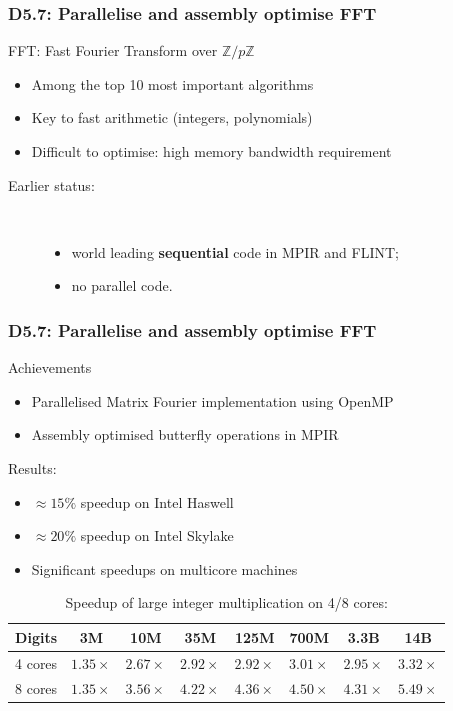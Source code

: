 \documentclass{beamer}
\begin{document}
\begin{frame}
  \frametitle{D5.7: Parallelise and assembly optimise FFT}

  \begin{block}    {FFT: Fast Fourier Transform over $\mathbb{Z}/p\mathbb{Z}$}
    \begin{itemize}
    \item Among the top 10 most important algorithms
    \item Key to fast arithmetic (integers, polynomials)
    \item Difficult to optimise: high memory bandwidth requirement
    \end{itemize}
    \begin{description}
    \item[Earlier status:]\
      \begin{itemize}
      \item world leading \textbf{sequential} code in MPIR and FLINT;
      \item no parallel code.
        \end{itemize}
    \end{description}
  \end{block}
\end{frame}
\begin{frame}
  \frametitle{D5.7: Parallelise and assembly optimise FFT}
  \begin{block} {Achievements}
  \begin{itemize}
  \item Parallelised Matrix Fourier implementation using OpenMP
  \item Assembly optimised butterfly operations in MPIR
\end{itemize}
  \end{block}

\begin{block}{Results:}

\begin{itemize}
\item $\approx 15\%$ speedup  on Intel Haswell
\item $\approx 20\%$ speedup on Intel Skylake
\item Significant speedups on multicore machines
\end{itemize}
\end{block}

\vspace{-1em}
\begin{table}
  \caption{Speedup of large integer multiplication on 4/8 cores:}
  \begin{tabular}{cccccccc}
  \toprule
{Digits} & 3M & 10M & 35M & 125M & 700M & 3.3B & 14B\\
\midrule
    {4 cores} & $1.35\times$ & $2.67\times$ & $2.92\times$ & $2.92\times$ & $3.01\times$ & $2.95\times$ & $3.32\times$ \\
{8 cores} & $1.35\times$ & $3.56\times$ & $4.22\times$ & $4.36\times$ & $4.50\times$ & $4.31\times$ & $5.49\times$\\
\bottomrule
\end{tabular}
\end{table}
\end{frame}
\end{document}
